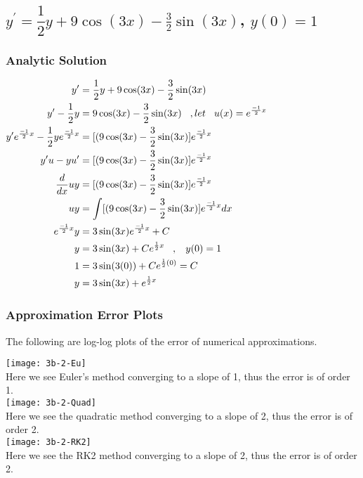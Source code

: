 \documentclass[12pt]{article}
\begin{document}
	\subsection{$y^{\prime}=\dfrac{1}{2}y+9\cos(3x)-\frac{3}{2}\sin(3x)$, $y(0)=1$ }
	\subsubsection{Analytic Solution}
	$
	\begin{aligned}
	y^{\prime}
	&=\frac{1}{2}y+9\cos(3x)-\frac{3}{2}\sin(3x)
	\\
	y^{\prime}-\frac{1}{2}y
	&=9\cos(3x)-\frac{3}{2}\sin(3x)\hspace{3mm},let \hspace{3mm} u(x)=e^{\frac{-1}{2}x}
	\\
	y^{\prime}e^{\frac{-1}{2}x}-\frac{1}{2}ye^{\frac{-1}{2}x}
	&=[(9\cos(3x)-\frac{3}{2}\sin(3x)]e^{\frac{-1}{2}x}
	\\
	y^{\prime}u-yu^{\prime}
	&=[(9\cos(3x)-\frac{3}{2}\sin(3x)]e^{\frac{-1}{2}x}
	\\
	\frac{d}{dx} uy
	&=[(9\cos(3x)-\frac{3}{2}\sin(3x)]e^{\frac{-1}{2}x}
	\\
	uy
	&=\int[(9\cos(3x)-\frac{3}{2}\sin(3x)]e^{\frac{-1}{2}x}dx
	\\
	e^{\frac{-1}{2}x}y
	&=3\sin(3x)e^{\frac{-1}{2}x} + C
	\\
	y
	&=3\sin(3x) + Ce^{\frac{1}{2}x} \hspace{3mm}, \hspace{3mm} y(0)=1
	\\
	1
	&=3\sin(3(0)) + Ce^{\frac{1}{2}(0)}=C
	\\
	y
	&=3\sin(3x) + e^{\frac{1}{2}x}
	\end{aligned}
	$
	
	\subsubsection{Approximation Error Plots}
	
	The following are log-log plots of the error of numerical approximations. 
	
	\texttt{[image: 3b-2-Eu]}
	\\
	Here we see Euler's method converging to a slope of 1, thus the error is of order 1.
	\\
	\texttt{[image: 3b-2-Quad]}
	\\
	Here we see the quadratic method converging to a slope of 2, thus the error is of order 2.
	\\
	\texttt{[image: 3b-2-RK2]}
	\\
	Here we see the RK2 method converging to a slope of 2, thus the error is of order 2.
	
\end{document}
